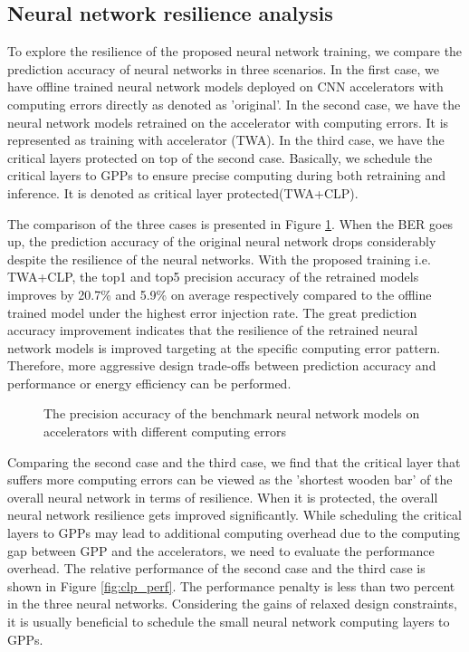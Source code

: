 \subsection{Neural network resilience analysis}
To explore the resilience of the proposed neural network training, we
compare the prediction accuracy of neural networks in three scenarios.
In the first case, we have offline trained neural network models deployed on 
CNN accelerators with computing errors directly as denoted as 'original'.
In the second case, we have the neural network models retrained on the 
accelerator with computing errors. It is represented as training with 
accelerator (TWA). In the third case, we have the critical layers 
protected on top of the second case. Basically, we schedule the critical layers to 
GPPs to ensure precise computing during both retraining and inference.
It is denoted as critical layer protected(TWA+CLP).

The comparison of the three cases is presented in Figure \ref{fig:softerror-accuracy}.
When the BER goes up, the prediction accuracy of the original neural network drops 
considerably despite the resilience of the neural networks. 
With the proposed training i.e. TWA+CLP, the top1 and top5 precision accuracy 
of the retrained models improves by 20.7\% and 5.9\% on average respectively 
compared to the offline trained model under the highest error injection rate. 
The great prediction accuracy improvement indicates that the resilience 
of the retrained neural network models is improved targeting at the 
specific computing error pattern. Therefore, more aggressive design trade-offs 
between prediction accuracy and performance or energy efficiency can be performed. 
\begin{figure}
        \center
        \qquad
        \qquad
        \caption{The precision accuracy of the benchmark neural network models on accelerators with different computing errors}
        \label{fig:softerror-accuracy}
\end{figure}


Comparing the second case and the third case, we find that the critical layer 
that suffers more computing errors can be viewed as the 'shortest 
wooden bar' of the overall neural network in terms of resilience. When it is protected, 
the overall neural network resilience gets improved significantly.
While scheduling the critical layers to GPPs may lead to additional computing overhead 
due to the computing gap between GPP and the accelerators, we need to evaluate the 
performance overhead. The relative performance of the second case and the third case 
is shown in Figure \ref{fig:clp_perf}. The performance penalty is less than two percent 
in the three neural networks. Considering the gains of relaxed design constraints, 
it is usually beneficial to schedule the small neural network computing layers to GPPs. 

